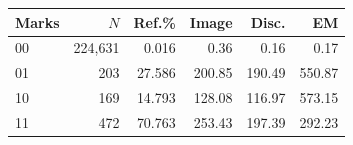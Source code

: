 \begin{tabular}{lrrrrr}
\toprule
Marks & $N$ & Ref.\% & Image & Disc. & EM \\
\midrule
00 & 224,631 & 0.016 & 0.36 & 0.16 & 0.17 \\
01 & 203 & 27.586 & 200.85 & 190.49 & 550.87 \\
10 & 169 & 14.793 & 128.08 & 116.97 & 573.15 \\
11 & 472 & 70.763 & 253.43 & 197.39 & 292.23 \\
\bottomrule
\end{tabular}
